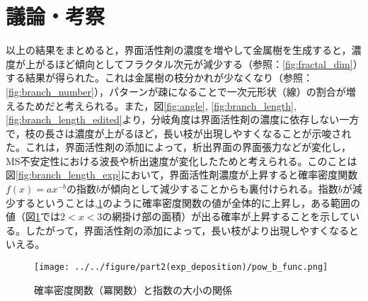 \documentclass[autodetect-engine,dvi=dvipdfmx,a4paper,ja=standard,oneside,openany,11pt,draft]{bxjsbook}
\begin{document}
\section{議論・考察}
以上の結果をまとめると，界面活性剤の濃度を増やして金属樹を生成すると，濃度が上がるほど傾向としてフラクタル次元が減少する（参照：\ref{fig:fractal_dim}）する結果が得られた。これは金属樹の枝分かれが少なくなり（参照：\ref{fig:branch_number}），パターンが疎になることで一次元形状（線）の割合が増えるためだと考えられる。また，図\ref{fig:angle}, \ref{fig:branch_length}, \ref{fig:branch_length_edited}より，分岐角度は界面活性剤の濃度に依存しない一方で，枝の長さは濃度が上がるほど，長い枝が出現しやすくなることが示唆された。これは，界面活性剤の添加によって，析出界面の界面張力などが変化し，MS不安定性における波長や析出速度が変化したためと考えられる。このことは図\ref{fig:branch_length_exp}において，界面活性剤濃度が上昇すると確率密度関数$f(x)=ax^{-b}$の指数$b$が傾向として減少することからも裏付けられる。指数$b$が減少するということは,\ref{fig:pow_b_func}のように確率密度関数の値が全体的に上昇し，ある範囲の値（図\ref{fig:pow_b_func}では$2<x<3$の網掛け部の面積）が出る確率が上昇することを示している。したがって，界面活性剤の添加によって，長い枝がより出現しやすくなるといえる。

\begin{figure}[htbp]
  \centering
  \texttt{[image: ../../figure/part2(exp\_deposition)/pow\_b\_func.png]}
  \caption{確率密度関数（冪関数）と指数の大小の関係}
  \label{fig:pow_b_func}
\end{figure}

\ifdraft{
  
  
}{}
\end{document}
